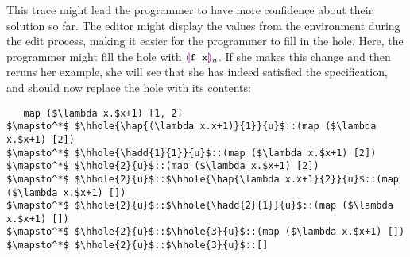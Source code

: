 This trace might lead the programmer to have more confidence about their
solution so far. The editor might display the values from the environment during the edit process, making it easier for the programmer to fill in the hole. Here, the programmer might fill the hole with $\textcolor{violet}{\llparenthesis}\texttt{f x}\textcolor{violet}{\rrparenthesis}_{u}$. If she
makes this change and then reruns her example, she will see that she has
indeed satisfied the specification, and should now replace the hole with
its contents:
\begin{lstlisting}
   map ($\lambda x.$x+1) [1, 2]
$\mapsto^*$ $\hhole{\hap{(\lambda x.x+1)}{1}}{u}$::(map ($\lambda x.$x+1) [2])
$\mapsto^*$ $\hhole{\hadd{1}{1}}{u}$::(map ($\lambda x.$x+1) [2])
$\mapsto^*$ $\hhole{2}{u}$::(map ($\lambda x.$x+1) [2])
$\mapsto^*$ $\hhole{2}{u}$::$\hhole{\hap{\lambda x.x+1}{2}}{u}$::(map ($\lambda x.$x+1) [])
$\mapsto^*$ $\hhole{2}{u}$::$\hhole{\hadd{2}{1}}{u}$::(map ($\lambda x.$x+1) [])
$\mapsto^*$ $\hhole{2}{u}$::$\hhole{3}{u}$::(map ($\lambda x.$x+1) [])
$\mapsto^*$ $\hhole{2}{u}$::$\hhole{3}{u}$::[]
\end{lstlisting}

